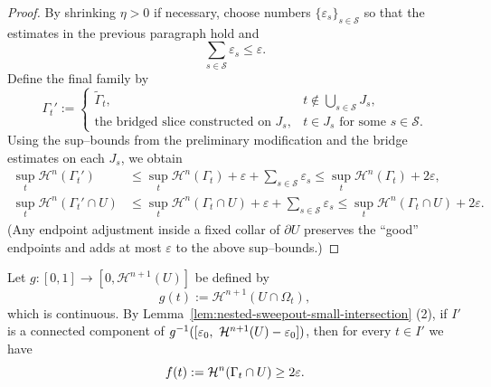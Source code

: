 \begin{lemma}
\begin{proof}
        By shrinking $\eta>0$ if necessary, choose numbers $\{\varepsilon_s\}_{s\in\mathcal S}$ so that the estimates in the previous paragraph hold and
        \begin{equation*}
          \sum_{s\in\mathcal S}\varepsilon_s \le \varepsilon.
        \end{equation*}
        Define the final family by
        \begin{equation*}
          \Gamma_t' :=
          \begin{cases}
            \widetilde{\Gamma}_t, & t\notin \displaystyle\bigcup_{s\in\mathcal S} J_s,\\[2pt]
            \text{the bridged slice constructed on }J_s, & t\in J_s \text{ for some } s\in\mathcal S.
          \end{cases}
        \end{equation*}
        Using the sup–bounds from the preliminary modification and the bridge estimates on each $J_s$, we obtain
        \begin{equation*}
            \begin{split}
                \sup_t \mathcal{H}^n(\Gamma_t')
                &\le \sup_t \mathcal{H}^n(\Gamma_t) + \varepsilon + \sum_{s\in\mathcal S}\varepsilon_s \le \sup_t \mathcal{H}^n(\Gamma_t)+2\varepsilon,\\
                \sup_t \mathcal{H}^n(\Gamma_t'\cap U)
                &\le \sup_t \mathcal{H}^n(\Gamma_t\cap U)+\varepsilon+\sum_{s\in\mathcal{S}}\varepsilon_s \le \sup_t \mathcal{H}^n(\Gamma_t\cap U)+2\varepsilon.
            \end{split}
        \end{equation*}
        (Any endpoint adjustment inside a fixed collar of $\partial U$ preserves the “good” endpoints and adds at most $\varepsilon$ to the above sup–bounds.)
    \end{proof}
\end{lemma}

Let $g:[0,1]\to[0,\mathcal{H}^{n+1}(U)]$ be defined by
\begin{equation*}
  g(t):=\mathcal{H}^{n+1}(U\cap\Omega_t),
\end{equation*}
which is continuous. %
By Lemma~\ref{lem:nested-sweepout-small-intersection} (2), if $I'$ is a connected component of
$g^{-1}([\eps_0,\ \mathcal{H}^{n+1}(U)-\eps_0])$, then for every $t\in I'$ we have
\begin{equation*}
  f(t):=\mathcal{H}^{n}(\Gamma_t\cap U) \ge 2\varepsilon.
\end{equation*}

